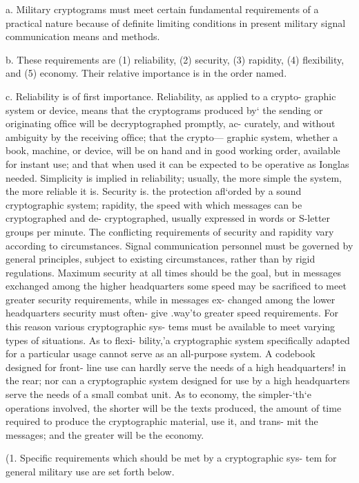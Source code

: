 a. Military cryptograms must meet certain fundamental requirements
of a practical nature because of deﬁnite limiting conditions in present
military signal communication means and methods.

b. These requirements are (1) reliability, (2) security, (3) rapidity,
(4) ﬂexibility, and (5) economy. Their relative importance is in the
order named.

c. Reliability is of ﬁrst importance. Reliability, as applied to a crypto-
graphic system or device, means that the cryptograms produced by‘ the
sending or originating ofﬁce will be decryptographed promptly, ac-
curately, and without ambiguity by the receiving ofﬁce; that the crypto—
graphic system, whether a book, machine, or device, will be on hand and
in good working order, available for instant use; and that when used it
can be expected to be operative as Ionglas needed. Simplicity is implied
in reliability; usually, the more simple the system, the more reliable it is.
Security is. the protection aﬂ‘orded by a sound cryptographic system;
rapidity, the speed with which messages can be cryptographed and de-
cryptographed, usually expressed in words or S-letter groups per minute.
The conﬂicting requirements of security and rapidity vary according to
circumstances. Signal communication personnel must be governed by
general principles, subject to existing circumstances, rather than by rigid
regulations. Maximum security at all times should be the goal, but in
messages exchanged among the higher headquarters some speed may be
sacriﬁced to meet greater security requirements, while in messages ex-
changed among the lower headquarters security must often- give .way'to
greater speed requirements. For this reason various cryptographic sys-
tems must be available to meet varying types of situations. As to ﬂexi-
bility,'a cryptographic system speciﬁcally adapted for a particular usage
cannot serve as an all-purpose system. A codebook designed for front-
line use can hardly serve the needs of a high headquarters! in the rear;
nor can a cryptographic system designed for use by a high headquarters
serve the needs of a small combat unit. As to economy, the simpler-‘th‘e
operations involved, the shorter will be the texts produced, the amount
of time required to produce the cryptographic material, use it, and trans-
mit the messages; and the greater will be the economy.

(1. Speciﬁc requirements which should be met by a cryptographic sys-
tem for general military use are set forth below.

